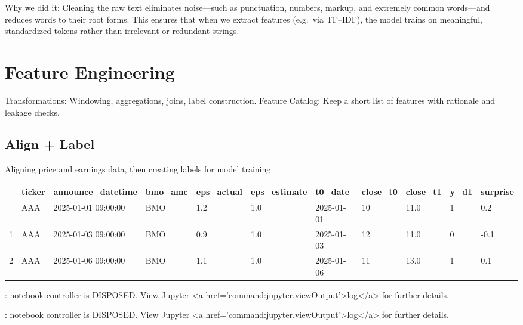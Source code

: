 \documentclass[
  letterpaper,
  DIV=11,
  numbers=noendperiod]{scrartcl}
\begin{document}
Why we did it: Cleaning the raw text eliminates noise---such as
punctuation, numbers, markup, and extremely common words---and reduces
words to their root forms. This ensures that when we extract features
(e.g.~via TF--IDF), the model trains on meaningful, standardized tokens
rather than irrelevant or redundant strings.

\section{Feature Engineering}\label{feature-engineering}

Transformations: Windowing, aggregations, joins, label construction.
Feature Catalog: Keep a short list of features with rationale and
leakage checks.

\subsection{Align + Label}\label{align-label}

Aligning price and earnings data, then creating labels for model
training

\begin{longtable}[]{@{}lllllllllll@{}}
\toprule\noalign{}
& ticker & announce\_datetime & bmo\_amc & eps\_actual & eps\_estimate &
t0\_date & close\_t0 & close\_t1 & y\_d1 & surprise \\
\midrule\noalign{}
\endhead
\bottomrule\noalign{}
\endlastfoot
0 & AAA & 2025-01-01 09:00:00 & BMO & 1.2 & 1.0 & 2025-01-01 & 10 & 11.0
& 1 & 0.2 \\
1 & AAA & 2025-01-03 09:00:00 & BMO & 0.9 & 1.0 & 2025-01-03 & 12 & 11.0
& 0 & -0.1 \\
2 & AAA & 2025-01-06 09:00:00 & BMO & 1.1 & 1.0 & 2025-01-06 & 11 & 13.0
& 1 & 0.1 \\
\end{longtable}

\begin{Highlighting}
\textcolor{black}{: }
\textcolor{black}{}\textcolor{QuartoInternalColor1}{notebook controller is DISPOSED. }
\textcolor{QuartoInternalColor1}{}\textcolor{QuartoInternalColor1}{View Jupyter <a href='command:jupyter.viewOutput'>log</a> for further details.}
\end{Highlighting}

\begin{Highlighting}
\textcolor{black}{: }
\textcolor{black}{}\textcolor{QuartoInternalColor1}{notebook controller is DISPOSED. }
\textcolor{QuartoInternalColor1}{}\textcolor{QuartoInternalColor1}{View Jupyter <a href='command:jupyter.viewOutput'>log</a> for further details.}
\end{Highlighting}
\end{document}
